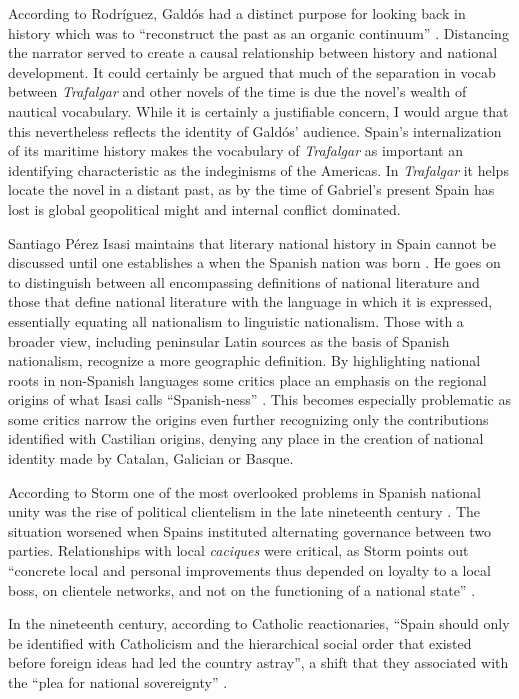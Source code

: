 \documentclass[12pt]{report}
\begin{document}
According to Rodríguez, Galdós had a distinct purpose for looking back in history which was to \enquote{reconstruct the past as an organic continuum} \cite[28]{Rodriguez1967}.
Distancing the narrator served to create a causal relationship between history and national development.
It could certainly be argued that much of the separation in vocab between \textit{Trafalgar} and other novels of the time is due the novel's wealth of nautical vocabulary.
While it is certainly a justifiable concern, I would argue that this nevertheless reflects the identity of  Galdós' audience.
Spain's internalization of its maritime history makes the vocabulary of \textit{Trafalgar} as important an identifying characteristic as the indeginisms of the Americas.
In \textit{Trafalgar} it helps locate the novel in a distant past, as by the time of Gabriel's present Spain has lost is global geopolitical might and internal conflict dominated.


Santiago Pérez Isasi maintains that literary national history in Spain cannot be discussed until one establishes a when the Spanish nation was born \cite[172]{Isasi2013}.
He goes on to distinguish between all encompassing definitions of national literature and those that define national literature with the language in which it is expressed, essentially equating all nationalism to linguistic nationalism. 
Those with a broader view, including peninsular Latin sources as the basis of Spanish nationalism, recognize a more geographic definition.
By highlighting national roots in non-Spanish languages some critics place an emphasis on the regional origins of what Isasi calls \enquote{Spanish-ness} \cite[173]{Isasi2013}.
This becomes especially problematic as some critics narrow the origins even further recognizing only the contributions identified with Castilian origins, denying any place in the creation of national identity made by Catalan, Galician or Basque.



According to Storm one of the most overlooked problems in Spanish national unity was the rise of political clientelism in the late nineteenth century \cite[147]{Storm2004}.
The situation worsened when Spains instituted alternating governance between two parties.
Relationships with local \textit{caciques} were critical, as Storm points out \enquote{concrete local and personal improvements thus depended on loyalty to a local boss, on clientele networks, and not on the functioning of a national state} \cite[148]{Storm2004}.

In the nineteenth century, according to Catholic reactionaries, \enquote{Spain should only be identified with Catholicism and the hierarchical social order that existed before foreign ideas had led the country astray}, a shift that they associated with the \enquote{plea for national sovereignty} \cite[149]{Storm2004}.
\end{document}
